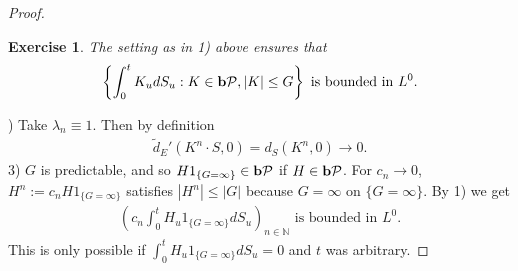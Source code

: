 \documentclass[12pt,a4paper, twoside]{article}
\newtheorem{exe}{Exercise}[section]
\theoremstyle{definition}
\newcommand{\pred}{\textbf{\text{b}}\mathcal{P}}
\begin{document}
\begin{proof}
\begin{exe} The setting as in 1) above ensures that 
\begin{align*}
\left\{ \int_0^t K_u dS_u : K \in \pred , |K | \leq G \right\} \text{ is bounded in } L^0.
\end{align*}
\end{exe}
) Take $\lambda_n \equiv 1$. Then by definition 
\begin{align*}
\widetilde{d}_E'( K^n \cdot S, 0) = d_S(K^n,0) \to 0. 
\end{align*}
3) $G$ is predictable, and so $H1_{\{ G = \infty\}} \in \pred$ if $H \in \pred$. For $c_n \to 0$, $H^n:= c_n H 1_{\{ G = \infty\}}$ satisfies $|H^n| \leq |G|$ because $G= \infty$ on $\{ G= \infty\}$. By 1) we get 
\begin{align*}
\left( c_n \int_0^t H_u 1_{\{ G= \infty\}} dS_u \right)_{n \in \mathbb{N}} \text{ is bounded in } L^0.
\end{align*}
This is only possible if $\int_0^t H_u 1_{\{ G= \infty\}} dS_u =0$ and $t$ was arbitrary. 
\end{proof}
\newpage
\end{document}
